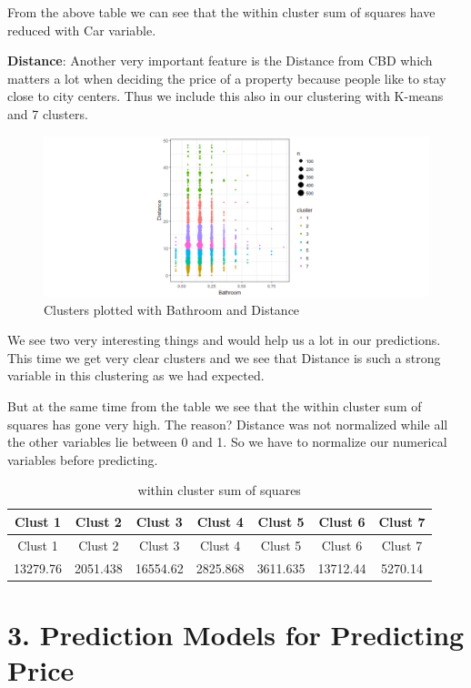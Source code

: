 \documentclass[]{article}
\begin{document}
From the above table we can see that the within cluster sum of squares
have reduced with Car variable.

\textbf{Distance}: Another very important feature is the Distance from
CBD which matters a lot when deciding the price of a property because
people like to stay close to city centers. Thus we include this also in
our clustering with K-means and 7 clusters.

\begin{figure}
\centering
\includegraphics{Report_files/figure-latex/unnamed-chunk-12-1.pdf}
\caption{Clusters plotted with Bathroom and Distance}
\end{figure}

We see two very interesting things and would help us a lot in our
predictions. This time we get very clear clusters and we see that
Distance is such a strong variable in this clustering as we had
expected.

But at the same time from the table we see that the within cluster sum
of squares has gone very high. The reason? Distance was not normalized
while all the other variables lie between 0 and 1. So we have to
normalize our numerical variables before predicting.

\begin{longtable}[]{@{}ccccccc@{}}
\caption{within cluster sum of squares}\tabularnewline
\toprule
Clust 1 & Clust 2 & Clust 3 & Clust 4 & Clust 5 & Clust 6 & Clust
7\tabularnewline
\midrule
\endfirsthead
\toprule
Clust 1 & Clust 2 & Clust 3 & Clust 4 & Clust 5 & Clust 6 & Clust
7\tabularnewline
\midrule
\endhead
13279.76 & 2051.438 & 16554.62 & 2825.868 & 3611.635 & 13712.44 &
5270.14\tabularnewline
\bottomrule
\end{longtable}

\pagebreak

\section{3. Prediction Models for Predicting
Price}\label{prediction-models-for-predicting-price}
\end{document}
